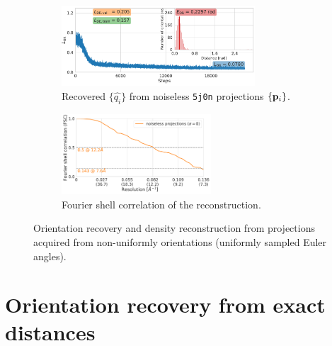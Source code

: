 
\begin{figure}[ht!]
    \centering
    \begin{subfigure}[b]{0.60\linewidth}
        \centering
        \includegraphics[height=3cm]{figures/5j0n_ar_aa_fullcvg.pdf}
        \caption{Recovered $\{ \widehat{q_i} \}$ from noiseless \texttt{5j0n} projections $\{ \mathbf{p}_i \}$.}
    \end{subfigure}
    \hfill
    \begin{subfigure}[b]{0.38\linewidth}
        \centering
        \includegraphics[height=3cm]{figures/5j0n_fullcvg_noise0_FSC_apr_init_customFSC.pdf}
        \caption{Fourier shell correlation of the reconstruction.}
    \end{subfigure}
    \caption{%
        Orientation recovery and density reconstruction from projections acquired from non-uniformly orientations (uniformly sampled Euler angles).
    }\label{fig:recovery-nonuniform}
\end{figure}

\section{Orientation recovery from exact distances}\label{apx:results:orientation-recovery:exact}


